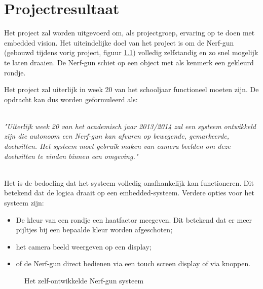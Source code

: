\chapter{Projectresultaat}

Het project zal worden uitgevoerd om, als projectgroep, ervaring op te doen met
embedded vision. Het uiteindelijke doel van het project is om de Nerf-gun
(gebouwd tijdens vorig project, figuur \ref{fig:nerf}) volledig zelfstandig en
zo snel mogelijk te laten draaien. De Nerf-gun schiet op een object met als
kenmerk een gekleurd rondje.

Het project zal uiterlijk in week 20 van het schooljaar functioneel moeten
zijn. De opdracht kan dus worden geformuleerd als:

\\

\emph{"Uiterlijk week 20 van het academisch jaar 2013/2014 zal een systeem
ontwikkeld zijn die autonoom een Nerf-gun kan afvuren op bewegende, gemarkeerde,
doelwitten. Het systeem moet gebruik maken van camera beelden om deze doelwitten
te vinden binnen een omgeving."}

\\

Het is de bedoeling dat het systeem volledig onafhankelijk kan functioneren.
Dit betekend dat de logica draait op een embedded-systeem. Verdere opties voor
het systeem zijn:

\begin{itemize}
    \item De kleur van een rondje een haatfactor meegeven. Dit betekend dat er
        meer pijltjes bij een bepaalde kleur worden afgeschoten;
    \item het camera beeld weergeven op een display;
    \item of de Nerf-gun direct bedienen via een touch screen display of via
        knoppen.
\end{itemize}

\begin{figure}
    \caption{Het zelf-ontwikkelde Nerf-gun systeem}
    \label{fig:nerf}
\end{figure}
